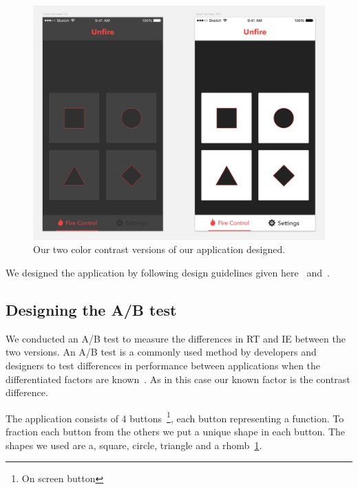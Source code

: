 \documentclass[runningheads,a4paper]{llncs}
\begin{document}
\begin{figure}
	\centering
	\includegraphics[width=\textwidth]{application}
	\caption{Our two color contrast versions of our application designed.\label{fig:application}}
\end{figure}

We designed the application by following design guidelines given here~\cite{hoober2011designing} and~\cite{johnson2013designing}. 

\subsection{Designing the A/B test}
We conducted an A/B test to measure the differences in RT and IE between the two versions. An A/B test is a commonly used method by developers and designers to test differences in performance between applications when the differentiated factors are known~\cite{johnson2013designing}. As in this case our known factor is the contrast difference. 

The application consists of 4 buttons~\footnote{On screen button}, each button representing a function. To fraction each button from the others we put a unique shape in each button. The shapes we used are a, square, circle, triangle and a rhomb~\ref{fig:application}.
\end{document}
